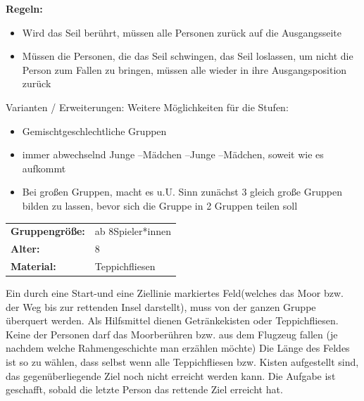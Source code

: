 \textbf{Regeln:}\\
\begin{itemize}
    \item Wird das Seil berührt, müssen alle Personen zurück auf die Ausgangsseite
    \item Müssen die Personen, die das Seil schwingen, das Seil loslassen, um nicht die Person zum Fallen zu bringen, müssen alle wieder in ihre Ausgangsposition zurück
\end{itemize}


Varianten / Erweiterungen:
Weitere Möglichkeiten für die Stufen:
\begin{itemize}
    \item Gemischtgeschlechtliche Gruppen
    \item immer abwechselnd Junge –Mädchen –Junge –Mädchen, soweit wie es aufkommt
    \item Bei großen Gruppen, macht es u.U. Sinn zunächst 3 gleich große Gruppen bilden zu lassen, bevor sich die Gruppe in 2 Gruppen teilen soll
\end{itemize}

\newpage

\begin{table}[H]
\begin{tabular}{>{\bfseries}lp{8cm}}
   Gruppengröße:   & ab 8Spieler*innen\\
    Alter: & 8 \\
    Material: & Teppichfliesen \\ 
\end{tabular}
\end{table} 

Ein durch eine Start-und eine Ziellinie markiertes Feld(welches das Moor bzw. der Weg bis zur rettenden Insel darstellt), muss von der ganzen Gruppe überquert werden. Als Hilfsmittel dienen Getränkekisten oder Teppichfliesen. Keine der Personen darf das Moorberühren bzw. aus dem Flugzeug fallen (je nachdem welche Rahmengeschichte man erzählen möchte) Die Länge des Feldes ist so zu wählen, dass selbst wenn alle Teppichfliesen bzw. Kisten aufgestellt sind, das 
gegenüberliegende Ziel noch nicht erreicht werden kann. Die Aufgabe ist geschafft, sobald die letzte Person das rettende Ziel erreicht hat.\\

